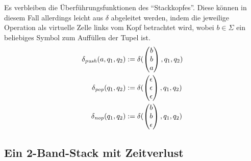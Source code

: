 \documentclass{article}
\begin{document}
Es verbleiben die Überführungsfunktionen des "`Stackkopfes"'. Diese können in diesem Fall allerdings leicht aus $\delta$ abgeleitet werden, indem die jeweilige Operation als virtuelle Zelle links vom Kopf betrachtet wird, wobei $b \in \Sigma$ ein beliebiges Symbol zum Auffüllen der Tupel ist.
\begin{align*}
    \delta_{\mathit{push}}(a, q_1, q_2) &:= \delta(\begin{pmatrix}b\\b\\a\end{pmatrix}, q_1, q_2) \\
    \delta_{\mathit{pop}}(q_1, q_2) &:= \delta(\begin{pmatrix}\epsilon\\\epsilon\\\epsilon\end{pmatrix}, q_1, q_2) \\
    \delta_{\mathit{nop}}(q_1, q_2) &:= \delta(\begin{pmatrix}b\\b\\\epsilon\end{pmatrix}, q_1, q_2) \\
\end{align*}

\subsection{Ein 2-Band-Stack mit Zeitverlust}
\end{document}
